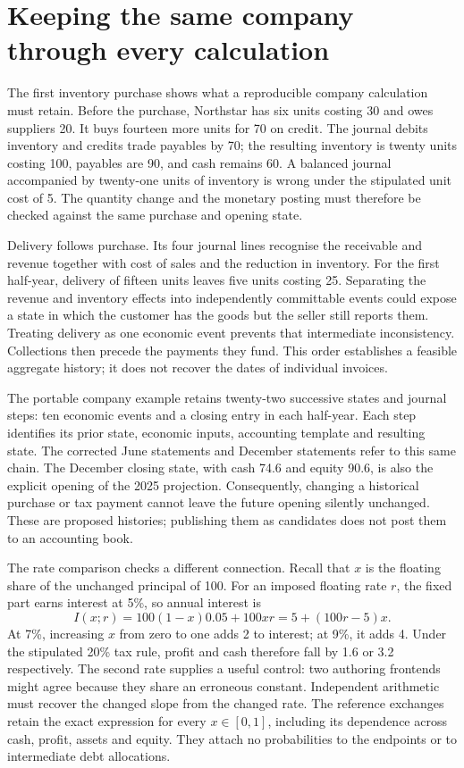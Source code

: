 \section{Keeping the same company through every calculation}
\label{sec:northstar-portable}

The first inventory purchase shows what a reproducible company calculation
must retain. Before the purchase, Northstar has six units costing 30 and owes
suppliers 20. It buys fourteen more units for 70 on credit. The journal debits
inventory and credits trade payables by 70; the resulting inventory is twenty
units costing 100, payables are 90, and cash remains 60. A balanced journal
accompanied by twenty-one units of inventory is wrong under the stipulated
unit cost of 5. The quantity change and the monetary posting must therefore be
checked against the same purchase and opening state.

Delivery follows purchase. Its four journal lines recognise the receivable and
revenue together with cost of sales and the reduction in inventory. For the
first half-year, delivery of fifteen units leaves five units costing 25.
Separating the revenue and inventory effects into independently committable
events could expose a state in which the customer has the goods but the seller
still reports them. Treating delivery as one economic event prevents that
intermediate inconsistency. Collections then precede the payments they fund.
This order establishes a feasible aggregate history; it does not recover the
dates of individual invoices.

The portable company example retains twenty-two successive states and journal
steps: ten economic events and a closing entry in each half-year. Each step
identifies its prior state, economic inputs, accounting template and resulting
state. The corrected June statements and December statements refer to this same
chain. The December closing state, with cash 74.6 and equity 90.6, is also the
explicit opening of the 2025 projection. Consequently, changing a historical
purchase or tax payment cannot leave the future opening silently unchanged.
These are proposed histories; publishing them as candidates does not post them
to an accounting book.

The rate comparison checks a different connection. Recall that $x$ is the
floating share of the unchanged principal of 100. For an imposed floating rate
$r$, the fixed part earns interest at 5\%, so annual interest is
\begin{equation}
 I(x;r)=100(1-x)0.05+100xr=5+(100r-5)x.
 \label{eq:northstar-portable-rate}
\end{equation}
At 7\%, increasing $x$ from zero to one adds 2 to interest; at 9\%, it adds 4.
Under the stipulated 20\% tax rule, profit and cash therefore fall by 1.6 or
3.2 respectively. The second rate supplies a useful control: two authoring
frontends might agree because they share an erroneous constant. Independent
arithmetic must recover the changed slope from the changed rate. The reference
exchanges retain the exact expression for every $x\in[0,1]$, including its
dependence across cash, profit, assets and equity. They attach no probabilities
to the endpoints or to intermediate debt allocations.

